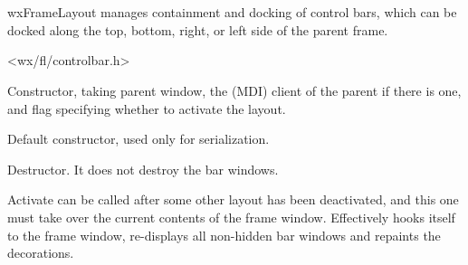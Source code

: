 %
%


\section{}\label{wxframelayout}


wxFrameLayout manages containment and docking of control bars,
which can be docked along the top, bottom, right, or left side of the
parent frame.




<wx/fl/controlbar.h>




\label{wxframelayoutwxframelayout}


Constructor, taking parent window, the (MDI) client of the parent if there
is one, and flag specifying whether to activate the layout.



Default constructor, used only for serialization.


\label{wxframelayoutdtor}


Destructor. It does not destroy the bar windows.


\label{wxframelayoutactivate}


Activate can be called after some other layout has been deactivated,
and this one must take over the current contents of the frame window.
Effectively hooks itself to the frame window, re-displays all non-hidden
bar windows and repaints the decorations.


\label{wxframelayoutaddbar}



